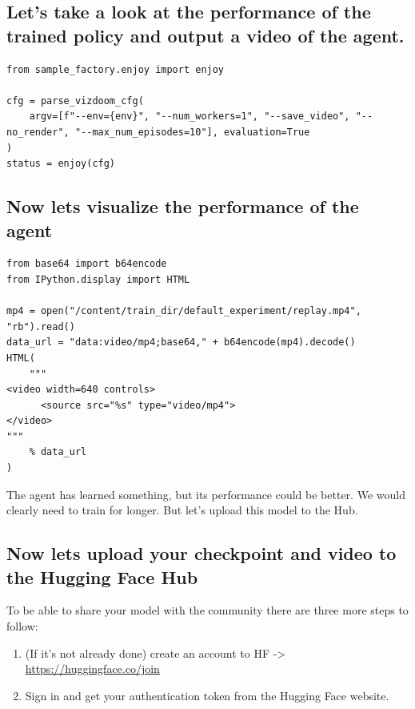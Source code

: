 \documentclass[11pt,a4paper]{article}
\begin{document}
\subsection{Let's take a look at the performance of the trained policy and output a video of the agent.}\label{lets-take-a-look-at-the-performance-of-the-trained-policy-and-output-a-video-of-the-agent.}

\begin{lstlisting}
from sample_factory.enjoy import enjoy

cfg = parse_vizdoom_cfg(
    argv=[f"--env={env}", "--num_workers=1", "--save_video", "--no_render", "--max_num_episodes=10"], evaluation=True
)
status = enjoy(cfg)
\end{lstlisting}

\subsection{Now lets visualize the performance of the agent}\label{now-lets-visualize-the-performance-of-the-agent}

\begin{lstlisting}
from base64 import b64encode
from IPython.display import HTML

mp4 = open("/content/train_dir/default_experiment/replay.mp4", "rb").read()
data_url = "data:video/mp4;base64," + b64encode(mp4).decode()
HTML(
    """
<video width=640 controls>
      <source src="%s" type="video/mp4">
</video>
"""
    % data_url
)
\end{lstlisting}

The agent has learned something, but its performance could be better. We would clearly need to train for longer. But let's upload this model to the Hub.

\subsection{Now lets upload your checkpoint and video to the Hugging Face Hub}\label{now-lets-upload-your-checkpoint-and-video-to-the-hugging-face-hub}

To be able to share your model with the community there are three more steps to follow:

\begin{enumerate}
\def\labelenumi{\arabic{enumi}.}
\item
  (If it's not already done) create an account to HF -\textgreater{} \url{https://huggingface.co/join}
\item
  Sign in and get your authentication token from the Hugging Face website.
\end{enumerate}
\end{document}
